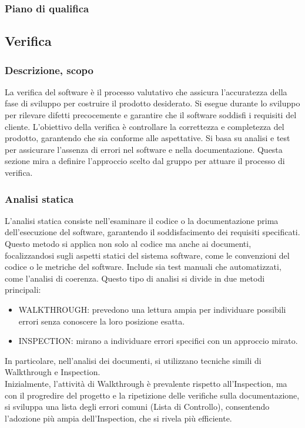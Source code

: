 \documentclass{article}
\begin{document}
    \subsubsection{Piano di qualifica}

\subsection{Verifica}
    \subsubsection{Descrizione, scopo}
    La verifica del software è il processo valutativo che assicura l'accuratezza della fase di sviluppo per costruire il prodotto desiderato. Si esegue durante lo sviluppo per rilevare difetti precocemente e garantire che il software soddisfi i requisiti del cliente. L'obiettivo della verifica è controllare la correttezza e completezza del prodotto, garantendo che sia conforme alle aspettative. Si basa su analisi e test per assicurare l'assenza di errori nel software e nella documentazione. Questa sezione mira a definire l'approccio scelto dal gruppo per attuare il processo di verifica.
    \subsubsection{Analisi statica}
    L'analisi statica consiste nell'esaminare il codice o la documentazione prima dell'esecuzione del software, garantendo il soddisfacimento dei requisiti specificati. Questo metodo si applica non solo al codice ma anche ai documenti, focalizzandosi sugli aspetti statici del sistema software, come le convenzioni del codice o le metriche del software. Include sia test manuali che automatizzati, come l'analisi di coerenza.
    Questo tipo di analisi si divide in due metodi principali: 

    \begin{itemize}
    \item WALKTHROUGH: prevedono una lettura ampia per individuare possibili errori senza conoscere la loro posizione esatta.
    \item INSPECTION: mirano a individuare errori specifici con un approccio mirato.
    \end{itemize}
    In particolare, nell'analisi dei documenti, si utilizzano tecniche simili di Walkthrough e Inspection.\\
    Inizialmente, l'attività di Walkthrough è prevalente rispetto all'Inspection, ma con il progredire del progetto e la ripetizione delle verifiche sulla documentazione, si sviluppa una lista degli errori comuni (Lista di Controllo), consentendo l'adozione più ampia dell'Inspection, che si rivela più efficiente.
\end{document}

